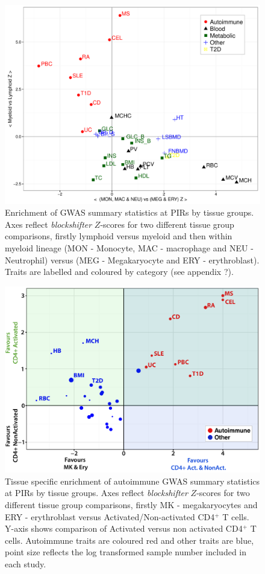 \documentclass[a4paper,11pt]{report}
\begin{document}
\begin{figure}[h]
\includegraphics[width=\textwidth]{block_shifter_scatter.pdf}
\caption{Enrichment of GWAS summary statistics at PIRs by tissue groups. Axes reflect \textit{blockshifter} $Z$-scores for two different tissue group comparisons, firstly lymphoid versus myeloid and then within myeloid lineage (MON - Monocyte, MAC - macrophage and NEU - Neutrophil) versus (MEG - Megakaryocyte and ERY - erythroblast). Traits are labelled and coloured by category (see appendix ?).}
\label{fig:bs_1}
\end{figure}

\begin{figure}[h]
\includegraphics[width=\textwidth]{tcell_blockshifter_scatter.pdf}
\caption{Tissue specific enrichment of autoimmune GWAS summary statistics at PIRs by tissue groups. Axes reflect \textit{blockshifter} $Z$-scores for two different tissue group comparisons, firstly MK - megakaryocytes and ERY - erythroblast versus Activated/Non-activated CD4$^{+}$ T cells. Y-axis shows comparison of Activated versus non activated CD4$^{+}$ T cells. Autoimmune traits are coloured red and other traits are blue, point size reflects the log transformed sample number included in each study.}
\label{fig:bs_2}
\end{figure}
\end{document}
